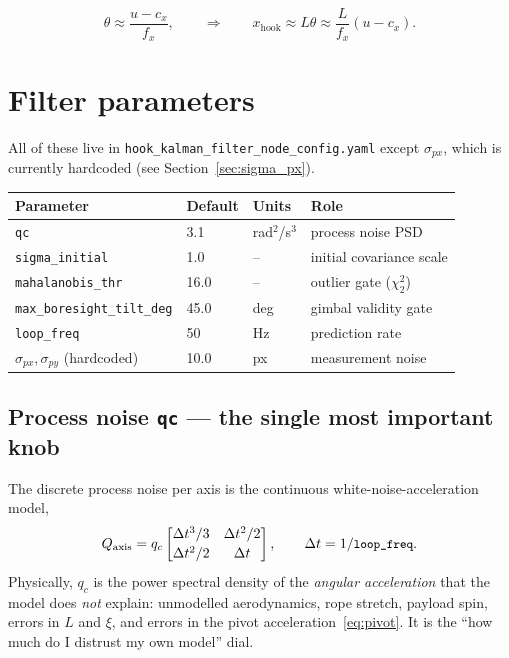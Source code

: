\documentclass[11pt,a4paper]{article}
\newcommand{\param}[1]{\texttt{\small #1}}
\begin{document}
\begin{equation}
\theta \approx \frac{u-c_x}{f_x},
\qquad\Longrightarrow\qquad
x_{\text{hook}} \approx L\theta \approx \frac{L}{f_x}(u-c_x).
\label{eq:pixel_to_metre}
\end{equation}

\section{Filter parameters}
\label{sec:filter}

All of these live in \param{hook\_kalman\_filter\_node\_config.yaml} except
$\sigma_{px}$, which is currently hardcoded (see
Section~\ref{sec:sigma_px}).

\begin{center}
\begin{tabular}{@{}llll@{}}
\toprule
\textbf{Parameter} & \textbf{Default} & \textbf{Units} & \textbf{Role} \\
\midrule
\param{qc}                     & 3.1  & rad$^2$/s$^3$ & process noise PSD \\
\param{sigma\_initial}         & 1.0  & --            & initial covariance scale \\
\param{mahalanobis\_thr}       & 16.0 & --            & outlier gate ($\chi^2_2$) \\
\param{max\_boresight\_tilt\_deg} & 45.0 & deg        & gimbal validity gate \\
\param{loop\_freq}             & 50   & Hz            & prediction rate \\
$\sigma_{px},\sigma_{py}$ (hardcoded) & 10.0 & px     & measurement noise \\
\bottomrule
\end{tabular}
\end{center}

\subsection{Process noise \param{qc} --- the single most important knob}

The discrete process noise per axis is the continuous white-noise-acceleration
model,
%
\begin{equation}
Q_{\text{axis}} = q_c
\begin{bmatrix}
\Delta t^3/3 & \Delta t^2/2\\[2pt]
\Delta t^2/2 & \Delta t
\end{bmatrix},
\qquad \Delta t = 1/\param{loop\_freq}.
\label{eq:Q}
\end{equation}
%
Physically, $q_c$ is the power spectral density of the \emph{angular
acceleration} that the model does \emph{not} explain: unmodelled aerodynamics,
rope stretch, payload spin, errors in $L$ and $\xi$, and errors in the pivot
acceleration~\eqref{eq:pivot}. It is the ``how much do I distrust my own
model'' dial.
\end{document}
